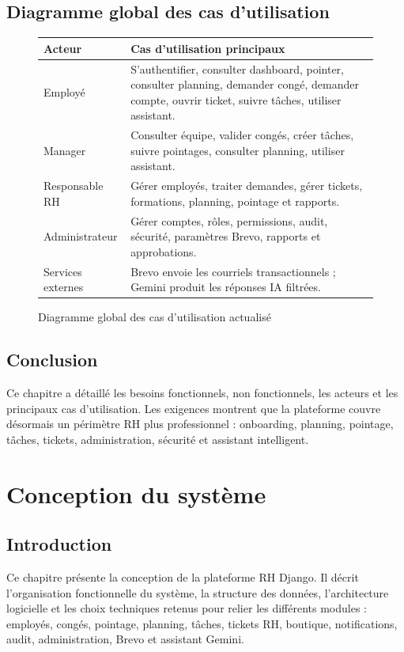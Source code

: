 \documentclass[12pt,a4paper]{report}
\begin{document}
\section{Diagramme global des cas d'utilisation}
\begin{figure}[H]
\centering
\renewcommand{\arraystretch}{1.2}
\begin{tabular}{|p{3cm}|p{10cm}|}
\hline
\textbf{Acteur} & \textbf{Cas d'utilisation principaux}\\ \hline
Employé & S'authentifier, consulter dashboard, pointer, consulter planning, demander congé, demander compte, ouvrir ticket, suivre tâches, utiliser assistant.\\ \hline
Manager & Consulter équipe, valider congés, créer tâches, suivre pointages, consulter planning, utiliser assistant.\\ \hline
Responsable RH & Gérer employés, traiter demandes, gérer tickets, formations, planning, pointage et rapports.\\ \hline
Administrateur & Gérer comptes, rôles, permissions, audit, sécurité, paramètres Brevo, rapports et approbations.\\ \hline
Services externes & Brevo envoie les courriels transactionnels ; Gemini produit les réponses IA filtrées.\\ \hline
\end{tabular}
\caption{Diagramme global des cas d'utilisation actualisé}
\label{fig:usecase-global}
\end{figure}

\section{Conclusion}
Ce chapitre a détaillé les besoins fonctionnels, non fonctionnels, les acteurs et les principaux cas d'utilisation. Les exigences montrent que la plateforme couvre désormais un périmètre RH plus professionnel : onboarding, planning, pointage, tâches, tickets, administration, sécurité et assistant intelligent.

\chapter{Conception du système}
\section{Introduction}
Ce chapitre présente la conception de la plateforme RH Django. Il décrit l'organisation fonctionnelle du système, la structure des données, l'architecture logicielle et les choix techniques retenus pour relier les différents modules : employés, congés, pointage, planning, tâches, tickets RH, boutique, notifications, audit, administration, Brevo et assistant Gemini.
\end{document}
